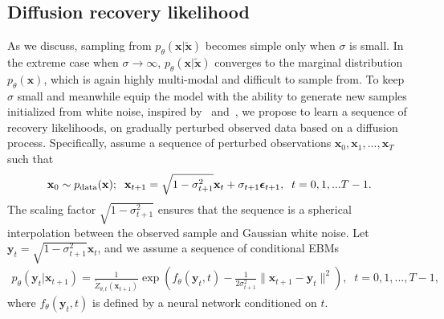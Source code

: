 \documentclass{article} \usepackage{iclr2021_conference,times}
\def\rvx{{\mathbf{x}}}
\def\rvy{{\mathbf{y}}}
\newcommand{\pdata}{p_{\rm{data}}}
\def\trvx{\tilde{\rvx}}
\def\beps{\bm{\epsilon}}
\begin{document}
\subsection{Diffusion recovery likelihood} \label{sect:seq}
As we discuss, sampling from $p_\theta(\rvx | \trvx)$ becomes simple only when $\sigma$ is small. In the extreme case when $\sigma \rightarrow \infty$, $p_\theta(\rvx | \trvx)$ converges to the marginal distribution $p_\theta(\rvx)$, which is again highly multi-modal and difficult to sample from. To keep $\sigma$ small and meanwhile equip the model with the ability to generate new samples initialized from white noise, inspired by~\citet{sohl2015deep} and~\citet{ho2020denoising}, we propose to learn a sequence of recovery likelihoods, on gradually perturbed observed data based on a diffusion process. Specifically, assume a sequence of perturbed observations $\rvx_0, \rvx_1, ..., \rvx_T$ such that 
\begin{eqnarray}
	\rvx_0 \sim \pdata(\rvx);\;\; \rvx_{t+1} = \sqrt{1 - \sigma_{t+1}^2} \rvx_{t} + \sigma_{t+1} \beps_{t+1},\;\;  t = 0, 1,... T-1.
\end{eqnarray}
The scaling factor $\sqrt{1 - \sigma_{t+1}^2}$ ensures that the sequence is a spherical interpolation between the observed sample and Gaussian white noise. Let $\rvy_{t} = \sqrt{1 - \sigma_{t+1}^2} \rvx_{t}$, and we assume a sequence of conditional EBMs
\begin{eqnarray} 
   p_\theta(\rvy_{t}|\rvx_{t+1}) = \frac{1}{\tilde{Z}_{\theta, t}(\rvx_{t+1})} \exp\left(f_\theta(\rvy_{t}, t) - \frac{1}{2\sigma_{t+1}^2} \|\rvx_{t+1}-\rvy_t\|^2\right), \;\; t = 0, 1, ..., T-1,
\end{eqnarray}
where $f_\theta(\rvy_t, t)$ is defined by a neural network conditioned on $t$. 
\end{document}
